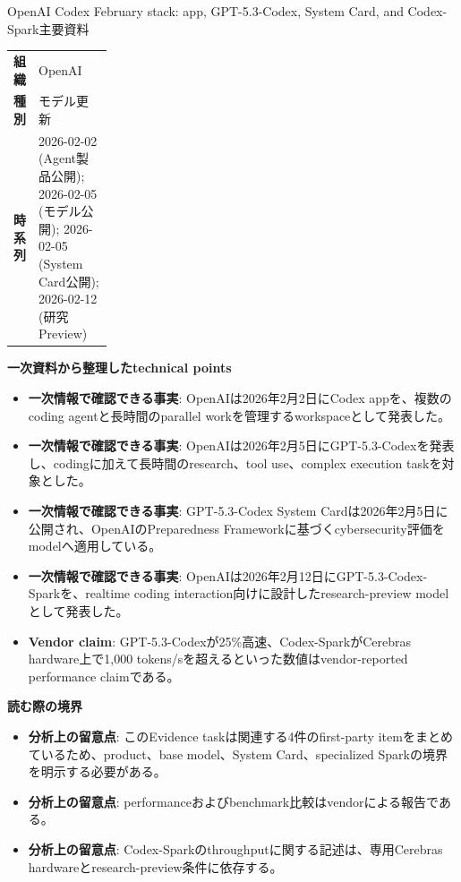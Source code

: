 \begin{technicalnote}{OpenAI Codex February stack: app, GPT-5.3-Codex, System Card, and Codex-Spark}{主要資料}
\begingroup
\begin{tabularx}{\linewidth}{@{}>{\bfseries}p{0.22\linewidth}X@{}}
組織 & OpenAI \\
種別 & モデル更新 \\
時系列 & 2026-02-02 (Agent製品公開); 2026-02-05 (モデル公開); 2026-02-05 (System Card公開); 2026-02-12 (研究Preview) \\
\end{tabularx}
\smallskip
{\bfseries 一次資料から整理したtechnical points}
\begin{itemize}[leftmargin=1.5em,itemsep=0.35em]
\item \textbf{一次情報で確認できる事実}: OpenAIは2026年2月2日にCodex appを、複数のcoding agentと長時間のparallel workを管理するworkspaceとして発表した。
\item \textbf{一次情報で確認できる事実}: OpenAIは2026年2月5日にGPT-5.3-Codexを発表し、codingに加えて長時間のresearch、tool use、complex execution taskを対象とした。
\item \textbf{一次情報で確認できる事実}: GPT-5.3-Codex System Cardは2026年2月5日に公開され、OpenAIのPreparedness Frameworkに基づくcybersecurity評価をmodelへ適用している。
\item \textbf{一次情報で確認できる事実}: OpenAIは2026年2月12日にGPT-5.3-Codex-Sparkを、realtime coding interaction向けに設計したresearch-preview modelとして発表した。
\item \textbf{Vendor claim}: GPT-5.3-Codexが25\%高速、Codex-SparkがCerebras hardware上で1,000 tokens/sを超えるといった数値はvendor-reported performance claimである。
\end{itemize}
\begin{minipage}{\linewidth}
{\bfseries 読む際の境界}
\begin{itemize}[leftmargin=1.5em,itemsep=0.35em]
\item \textbf{分析上の留意点}: このEvidence taskは関連する4件のfirst-party itemをまとめているため、product、base model、System Card、specialized Sparkの境界を明示する必要がある。
\item \textbf{分析上の留意点}: performanceおよびbenchmark比較はvendorによる報告である。
\item \textbf{分析上の留意点}: Codex-Sparkのthroughputに関する記述は、専用Cerebras hardwareとresearch-preview条件に依存する。

\end{itemize}
\end{minipage}
\end{technicalnote}
